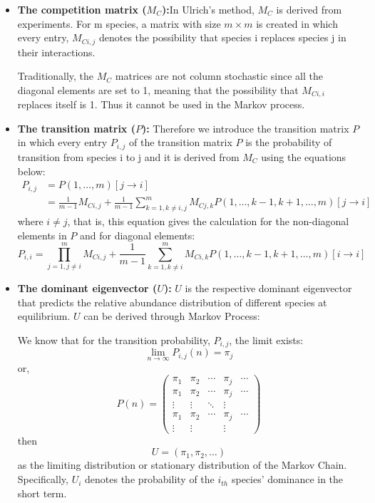 \documentclass[12pt]{article}
\begin{document}
\begin{itemize}
\item \textbf {The competition matrix ($M_{C}$):}In Ulrich's method, $M_{C}$ is derived from experiments. For m species, a matrix with size $m \times m$ is created in which every entry, $M_{C i,j}$ denotes the possibility that species i replaces species j in their interactions. 

Traditionally, the $M_{C}$ matrices are not column stochastic since all the diagonal elements are set to 1, meaning that the possibility that $M_{C i,i}$ replaces itself is 1. Thus it cannot be used in the Markov process. 
\item \textbf {The transition matrix ($P$):} Therefore we introduce the transition matrix $P$ in which every entry $P_{i,j}$ of the transition matrix $P$ is the probability of transition from species i to j and it is derived from $M_{C}$ using the equations below:
\begin{equation}
	\begin{aligned}
		P_{i,j}&=P\left( 1,\ldots ,m\right)  \left[ j\rightarrow i\right]\\
		&=\frac{1}{m-1} M_{C i,j}+\frac{1}{m-1} \sum^{m}_{k=1,k \neq i,j} M_{C j,k}P\left( 1,\ldots ,k-1,k+1,\ldots ,m\right)  \left[ j\rightarrow i\right]  
	\end{aligned}
\end{equation}
where $i \neq j$, that is, this equation gives the calculation for the non-diagonal elements in $P$ and for diagonal elements:
\begin{equation}
	P_{i,i}=\prod^{m}_{j=1,j \neq i} M_{C i,j}+\frac{1}{m-1} \sum^{m}_{k=1,k \neq i} M_{C i,k}P\left( 1,\ldots ,k-1,k+1,\ldots ,m\right)  \left[ i\rightarrow i\right]  
\end{equation}
\item \textbf{The dominant eigenvector ($U$):} $U$ is the respective dominant eigenvector that predicts the relative abundance distribution of different species at equilibrium. $U$ can be derived through Markov Process:

We know that for the transition probability, $P_{i,j}$, the limit exists:
\begin{equation}
	 \lim_{n\rightarrow \infty } P_{i,j}\left( n\right)  =\pi_{j} 
\end{equation}
or,
\begin{equation}
	P(n)=
	\begin{pmatrix}
		\pi_{1}&\pi_{2}  & \cdots  &\pi_{j} &\cdots \\ 
		\pi_{1}&\pi_{2}  & \cdots  &\pi_{j} &\cdots\\ 
		\vdots &\vdots  & \ddots & \vdots\\ 
		\pi_{1}&\pi_{2}  & \cdots  &\pi_{j} &\cdots\\
		\vdots &\vdots  &        &\vdots   &
	\end{pmatrix}
\end{equation}
then 
\begin{equation}
	U=(\pi_{1},\pi_{2},\hdots)
\end{equation}
as the limiting distribution or stationary distribution of the Markov Chain.
Specifically, $U_{i}$ denotes the probability of the $i_{th}$ species' dominance in the short term. 
\end{itemize}
\end{document}
